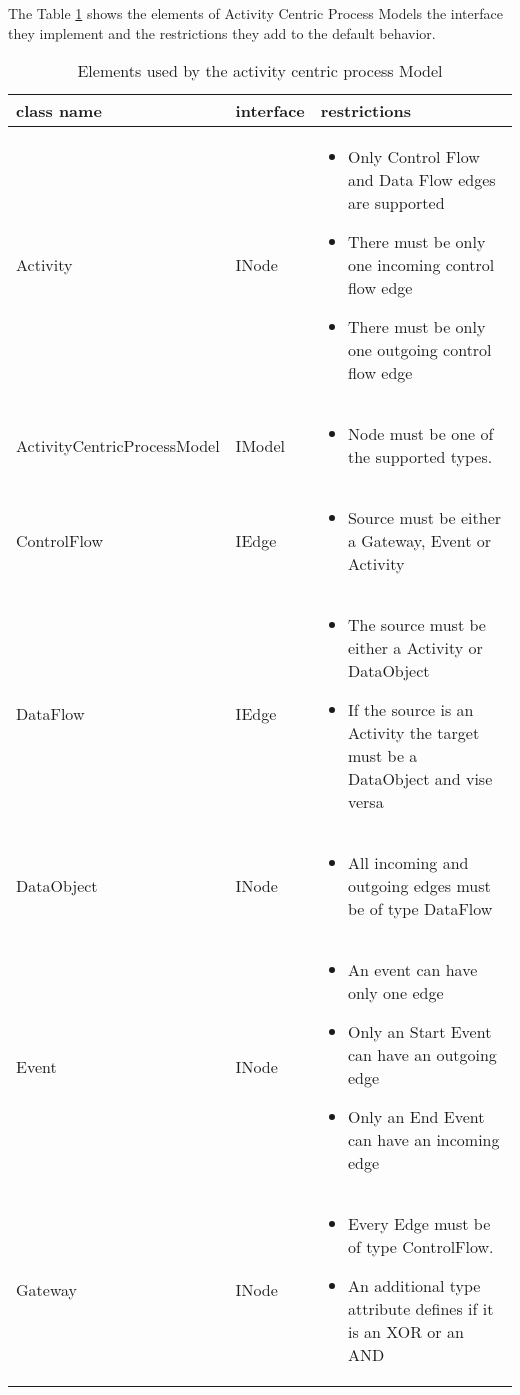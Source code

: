 The Table \ref{tbl:acpm_elements} shows the elements of Activity Centric Process Models the interface they implement and the restrictions they add to the default behavior.

\begin{table}[h]
	\centering
	\begin{tabular}{|l|l|p{8cm}|}
		\hline
		\textbf{class name} & \textbf{interface} & \textbf{restrictions}\\
		\hline
		Activity & INode & \begin{itemize}
					\item Only Control Flow and Data Flow edges are supported
					\item There must be only one incoming control flow edge
					\item There must be only one outgoing control flow edge
				\end{itemize}\\
		\hline
		ActivityCentricProcessModel & IModel & \begin{itemize}
			\item Node must be one of the supported types.
		\end{itemize}\\
		\hline
		ControlFlow & IEdge & \begin{itemize}
									\item Source must be either a Gateway, Event or Activity
								\end{itemize}\\
		\hline
		DataFlow & IEdge & \begin{itemize}
								\item The source must be either a Activity or DataObject
								\item If the source is an Activity the target must be a DataObject and vise versa
							\end{itemize}\\
		\hline
		DataObject & INode & \begin{itemize}
								\item All incoming and outgoing edges must be of type DataFlow
							\end{itemize}\\
		\hline
		Event & INode & \begin{itemize}
							\item An event can have only one edge
							\item Only an Start Event can have an outgoing edge
							\item Only an End Event can have an incoming edge
						\end{itemize}\\
		\hline
		Gateway & INode & \begin{itemize}
							\item Every Edge must be of type ControlFlow.
							\item An additional type attribute defines if it is an XOR or an AND
						\end{itemize}\\
		\hline
	\end{tabular}
	\caption{Elements used by the activity centric process Model}
	\label{tbl:acpm_elements}
\end{table}

